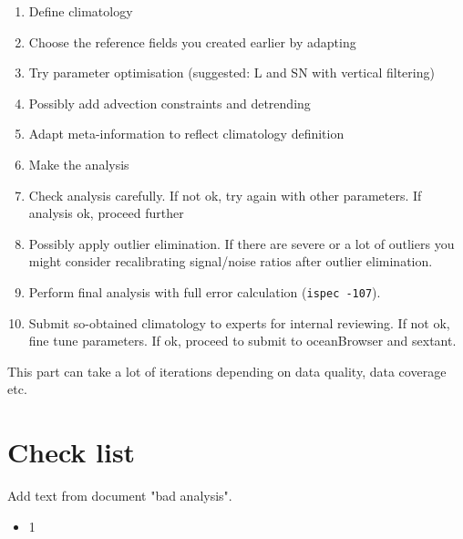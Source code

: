 \documentclass[a4paper,12pt,oneside,notitlepage]{book}
\newcommand{\file}[1]{\texttt{\color{MidnightBlue}{#1}}}
\newcommand{\command}[1]{\texttt{\color{RedOrange}{#1}}}
\begin{document}
\begin{enumerate}
\item Define climatology \file{yearlist, monthlist, varlist}
\item Choose the reference fields you created earlier by adapting \file{constandrefe}
\item Try parameter optimisation (suggested: L and SN with vertical filtering)
\item Possibly add advection constraints and detrending
\item Adapt meta-information to reflect climatology definition
\item Make the analysis
\item Check analysis carefully. If not ok, try again with other parameters. If analysis ok, proceed further
\item Possibly apply outlier elimination. If there are severe or a lot of outliers you might consider recalibrating signal/noise ratios after outlier elimination.

\item Perform final analysis with full error calculation ({\tt ispec -107}).
\item Submit so-obtained climatology to experts for internal reviewing. If not ok, fine tune parameters. If ok, proceed to submit to oceanBrowser and sextant.
\end{enumerate}


This part can take a lot of iterations depending on data quality, data coverage etc.


\section{Check list}

Add text from document "bad analysis".

\begin{itemize}
\item[\checkmark] 1
\end{itemize}





\end{document}
